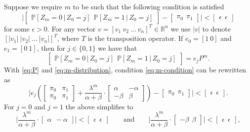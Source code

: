 \documentclass[runningheads,a4paper]{llncs}
\begin{document}
Suppose we require $m$ to be such that the following condition is satisfied
\begin{equation}
\label{eq:m-condition}
\Big|\left[ \begin{array}{c}
\mathbb{P}[Z_m=0\,|\,Z_0=j] ~~
\mathbb{P}[Z_m=1\,|\,Z_0=j]
\end{array} \right]
-
\left[ \begin{array}{c}
\pi_0 ~~
\pi_1
\end{array} \right]
\Big|
<
\left[ \begin{array}{c}
\epsilon ~~
\epsilon
\end{array} \right]
\end{equation}
for some $\epsilon > 0$. For any vector $v=[v_1\ v_2\ \ldots\ v_n]^T \in\mathbb{R}^n$ we use $|v|$
to denote $[|v_1|\ |v_2|\ \allowbreak \ldots\ \allowbreak |v_n|]^T$, where $T$ is the
transposition operator. If $e_0=[1\ 0]$ and $e_1 = [0\ 1]$, then for $j \in \{0,1\}$ we have that
\begin{equation}
\label{eq:m-distribution}
\left[ \begin{array}{c}
\mathbb{P}[Z_m=0\,|\,Z_0=j] ~~
\mathbb{P}[Z_m=1\,|\,Z_0=j]
\end{array} \right]
=e_jP^m.
\end{equation}
With \eqref{eq:P} and \eqref{eq:m-distribution}, condition \eqref{eq:m-condition} can be rewritten
as
\[
\Bigg|e_j\left(
\left[ \begin{array}{cc}
\pi_0 & \pi_1 \\
\pi_0 & \pi_1
\end{array} \right] +
\frac{\lambda^m}{\alpha+\beta}\cdot
\left[ \begin{array}{cc}
\alpha & -\alpha \\
-\beta & \beta
\end{array} \right]
\right)
-
\left[ \begin{array}{c}
\pi_0 ~~
\pi_1
\end{array} \right]
\Bigg| <
\left[ \begin{array}{c}
\epsilon ~~
\epsilon
\end{array} \right].
\]
For $j = 0$ and $j = 1$ the above simplifies to
\[
\Bigg|
\frac{\lambda^m}{\alpha+\beta}\cdot
\left[ \begin{array}{c}
\alpha ~~
-\alpha
\end{array} \right]
\Bigg| <
\left[ \begin{array}{c}
\epsilon ~~
\epsilon
\end{array} \right]
\qquad \textrm{and} \qquad
\Bigg|
\frac{\lambda^m}{\alpha+\beta}\cdot
\left[ \begin{array}{c}
-\beta ~~
\beta
\end{array} \right]
\Bigg| <
\left[ \begin{array}{c}
\epsilon ~~
\epsilon
\end{array} \right],
\]
\end{document}

